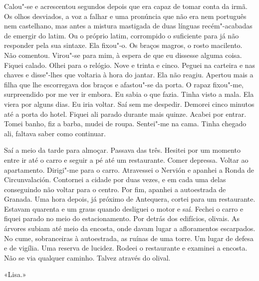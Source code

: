 Calou"-se e acrescentou segundos depois que era capaz de tomar conta da
irmã. Os olhos desviados, a voz a falhar e uma pronúncia que
não era nem português nem castelhano, mas antes a mistura mastigada de
duas línguas recém"-acabadas de emergir do latim. Ou o próprio latim,
corrompido o suficiente para já não responder pela sua sintaxe. Ela
fixou"-o. Os braços magros, o rosto macilento. Não comentou. Virou"-se
para mim, à espera de que eu dissesse alguma coisa. Fiquei calado. Olhei
para o relógio. Nove e trinta e cinco. Peguei na carteira e nas chaves e
disse"-lhes que voltaria à hora do jantar. Ela não reagiu. Apertou mais
a filha que lhe escorregava dos braços e afastou"-se da porta. O rapaz
fixou"-me, surpreendido por me ver ir embora. Eu sabia o que fazia.
Tinha visto a mala. Ela viera por alguns dias. Eu iria voltar. Saí sem
me despedir. Demorei cinco minutos até a porta do hotel. Fiquei ali
parado durante mais quinze. Acabei por entrar. Tomei banho, fiz a barba,
mudei de roupa. Sentei"-me na cama. Tinha chegado ali, faltava saber
como continuar.

Saí a meio da tarde para almoçar. Passava das três. Hesitei por um
momento entre ir até o carro e seguir a pé até um restaurante. Comer
depressa. Voltar ao apartamento. Dirigi"-me para o carro. Atravessei o
Nervión e apanhei a Ronda de Circunvalación. Contornei a cidade
por duas vezes, e em cada uma delas conseguindo não voltar para o
centro. Por fim, apanhei a autoestrada de Granada. Uma hora depois, já
próximo de Antequera, cortei para um restaurante. Estavam quarenta e um
graus quando desliguei o motor e saí. Fechei o carro e fiquei parado no
meio do estacionamento. Por detrás dos edifícios, olivais. As árvores
subiam até meio da encosta, onde davam lugar a afloramentos escarpados.
No cume, sobranceiras à autoestrada, as ruínas de uma torre. Um lugar
de defesa e de vigília. Uma reserva de lucidez. Rodeei o restaurante e
examinei a encosta. Não se via qualquer caminho. Talvez através do
olival.

«Lisa.»

